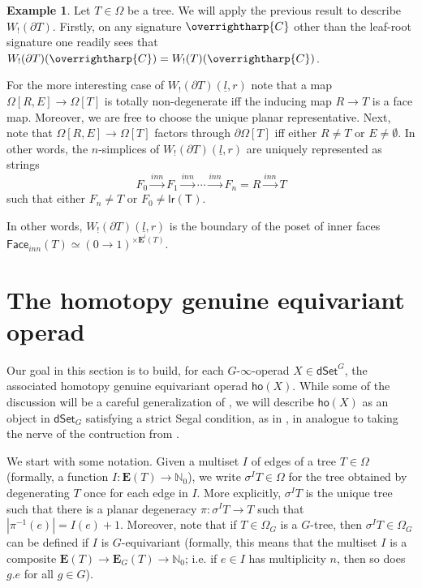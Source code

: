 \documentclass[a4paper,10pt
,draft
]{article}%
\numberwithin{equation}{section}
\numberwithin{figure}{section}
\theoremstyle{definition} %
\newtheorem{example}[equation]{Example}%
\newcommand{\vect}[1]{\text{\overrightharp{\ensuremath{#1}}}}
\newcommand{\1}{\ensuremath{\mathbbm 1}}%
\begin{document}
\begin{example}
      \label{WPARTIALT_EX}
      Let $T \in \Omega$ be a tree.
      We will apply the previous result to describe
      $W_!(\partial T)$.
      Firstly, 
      on any signature $\vect{C}$
      other than the leaf-root signature
      one readily sees that
      $W_!(\partial T)(\vect{C}) = W_!(T)(\vect{C})$.

      For the more interesting case of 
      $W_!(\partial T)(\underline{l},r)$
      note that a map
      $\Omega[R,E] \to \Omega [T]$
      is totally non-degenerate iff
      the inducing map $R \to T$
      is a face map. Moreover, we are free to choose the unique planar representative.
      Next, note that 
      $\Omega[R,E] \to \Omega [T]$
      factors through $\partial \Omega[T]$
      iff either $R \neq T$ or $E \neq \emptyset$.
      In other words, the $n$-simplices of 
      $W_!(\partial T)(\underline{l},r)$
      are uniquely represented as strings
      \[
            F_0 \xrightarrow{inn} 
            F_1 \xrightarrow{inn} 
            \cdots \xrightarrow{inn}
            F_n = R \xrightarrow{inn} T
      \]
      such that either $F_n \neq T$ or $F_0 \neq \mathsf{lr(T)}$.

In other words, 
$W_!(\partial T)(\underline{l},r)$
is the boundary of the poset of inner faces
$\mathsf{Face}_{inn}(T) \simeq 
(0 \to 1)^{\times \boldsymbol{E}^{\mathsf{i}}(T)}.$
\end{example}








\newpage




\section{The homotopy genuine equivariant operad}
\label{HO_SEC}

Our goal in this section is to build,
for each $G$-$\infty$-operad $X \in \mathsf{dSet}^G$,
the associated homotopy genuine equivariant operad
$\mathsf{ho} (X)$.
While some of the discussion will be a careful generalization of \cite[\S 6]{MW09},
we will describe $\mathsf{ho} (X)$ as an object in
$\mathsf{dSet}_G$
satisfying a strict Segal condition, as in \cite[\S 3.3]{BP_edss},
in analogue to taking the nerve of the contruction from \cite{MW09}.

We start with some notation. 
Given a multiset $I$ of edges of a tree $T \in \Omega$
(formally, a function 
$I \colon \boldsymbol{E}(T) \to \mathbb{N}_0$),
we write $\sigma^I T \in \Omega$
for the tree obtained by degenerating $T$ once for each edge in $I$.
More explicitly, $\sigma^I T$ is the unique tree such that there is a planar degeneracy
$\pi \colon \sigma^I T \to T$
such that $|\pi^{-1}(e)| = I(e) + 1$.
Moreover,
note that if $T\in \Omega_G$ is a $G$-tree, 
then $\sigma^{I} T \in \Omega_{G}$
can be defined if $I$ is $G$-equivariant
(formally, this means that the multiset $I$ is a composite
$\boldsymbol{E}(T) \to \boldsymbol{E}_G(T)
\to \mathbb{N}_0$;
i.e. if $e \in I$ has multiplicity $n$, then so does $ g.e$ for all $g \in G$).
\end{document}
